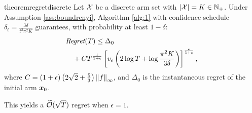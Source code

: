 \documentclass{article}
\begin{document}
\begin{restatable}{theorem}{regretdiscrete}\label{th:regretdiscrete}
	Let $\Xspace$ be a discrete arm set with ${|\mathcal{X}| = K \in \Naturals_{+}}$. Under Assumption \ref{ass:boundrenyi}, Algorithm \ref{alg:1} with confidence schedule $\delta_t = \frac{3\delta}{t^2\pi^2K}$ guarantees, with probability at least $1-\delta$:
	\begin{align*}
		&\Reg(T) \leq \Delta_0 \\
		&\quad+ 	C
			T^{\frac{1}{1+\epsilon}}
			\left[v_{\epsilon}
			\left(2\log T + \log \frac{\pi^2K}{3\delta}\right)
			\right]^{\frac{\epsilon}{1+\epsilon}},
	\end{align*}
	where $C=(1+\epsilon)\left(2\sqrt{2}+\frac{5}{3}\right)\norm[\infty]{f}$, and $\Delta_0$ is the instantaneous regret of the initial arm $\vx_0$.
\end{restatable}
This yields a $\wt{\mathcal{O}}(\sqrt{T})$ regret when $\epsilon=1$.
\end{document}
